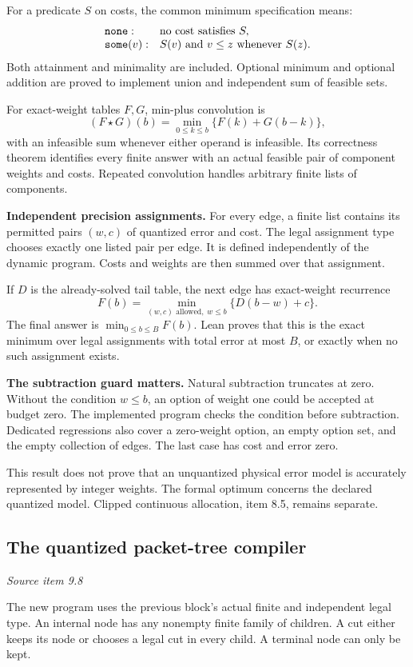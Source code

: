 For a predicate $S$ on costs, the common minimum specification means:
\[
\begin{array}{ll}
\texttt{none}: & \text{no cost satisfies }S,\\
\texttt{some}(v): & S(v)\text{ and }v\leq z\text{ whenever }S(z).
\end{array}
\]
Both attainment and minimality are included. Optional minimum and optional addition are proved to implement union and independent sum of feasible sets.

For exact-weight tables $F,G$, min-plus convolution is
\[
(F\star G)(b)=\min_{0\leq k\leq b}\{F(k)+G(b-k)\},
\]
with an infeasible sum whenever either operand is infeasible. Its correctness theorem identifies every finite answer with an actual feasible pair of component weights and costs. Repeated convolution handles arbitrary finite lists of components.

\textbf{Independent precision assignments.} For every edge, a finite list contains its permitted pairs $(w,c)$ of quantized error and cost. The legal assignment type chooses exactly one listed pair per edge. It is defined independently of the dynamic program. Costs and weights are then summed over that assignment.

If $D$ is the already-solved tail table, the next edge has exact-weight recurrence
\[
F(b)=\min_{(w,c)\text{ allowed},\;w\leq b}\{D(b-w)+c\}.
\]
The final answer is $\min_{0\leq b\leq B}F(b)$. Lean proves that this is the exact minimum over legal assignments with total error at most $B$, or  exactly when no such assignment exists.

\textbf{The subtraction guard matters.} Natural subtraction truncates at zero. Without the condition $w\leq b$, an option of weight one could be accepted at budget zero. The implemented program checks the condition before subtraction. Dedicated regressions also cover a zero-weight option, an empty option set, and the empty collection of edges. The last case has cost and error zero.

This result does not prove that an unquantized physical error model is accurately represented by integer weights. The formal optimum concerns the declared quantized model. Clipped continuous allocation, item 8.5, remains separate.



\subsection{The quantized packet-tree compiler}\label{supp3:subsection:005}\textit{Source item 9.8}\par
The new program uses the previous block's actual finite  and independent legal  type. An internal node has any nonempty finite family of children. A cut either keeps its node or chooses a legal cut in every child. A terminal node can only be kept.

